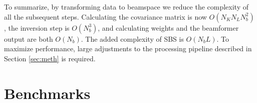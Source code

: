 \documentclass[12pt,journal,onecolumn]{IEEEtran}
\newcommand{\mat}[1]{\mathbf{#1}}
\renewcommand{\vec}[1]{\mathbf{#1}}
\begin{document}
To summarize, by transforming data to beamspace we reduce the complexity of all the subsequent steps. Calculating the covariance matrix is now $O(N_KN_LN_b^2)$, the inversion step is $O(N_b^3)$, and calculating weights and the beamformer output are both $O(N_b)$. The added complexity of SBS is $O(N_bL)$. To maximize performance, large adjustments to the processing pipeline described in Section \ref{sec:meth} is required.





 

\section{Benchmarks}\label{sec:res}

\end{document}
